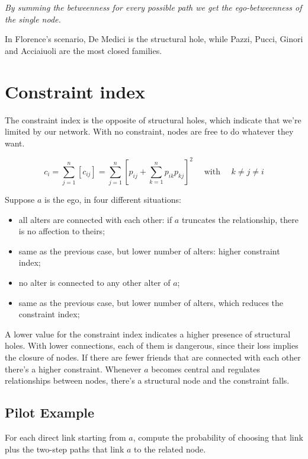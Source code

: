 \documentclass[
  notitlepage,
  onecolumn,
  openany]{book}
\providecommand{\tightlist}{%
  \setlength{\itemsep}{0pt}\setlength{\parskip}{0pt}}
\begin{document}
\emph{By summing the betweenness for every possible path we get the ego-betweenness of the single node.}

In Florence's scenario, De Medici is the structural hole, while Pazzi, Pucci, Ginori and Acciaiuoli are the most closed families.

\hypertarget{constraint-index}{%
\section{Constraint index}\label{constraint-index}}

The constraint index is the opposite of structural holes, which indicate that we're limited by our network. With no constraint, nodes are free to do whatever they want.

\[
c_{i}=\sum_{j=1}^{n}\left[c_{i j}\right]=\sum_{j=1}^{n}\left[p_{i j}+\sum_{k=1}^{n} p_{i k} p_{k j}\right]^{2} \quad \text { with } \quad k \neq j \neq i
\]

Suppose \(a\) is the ego, in four different situations:

\begin{itemize}
\tightlist
\item
  all alters are connected with each other: if \(a\) truncates the relationship, there is no affection to theirs;
\item
  same as the previous case, but lower number of alters: higher constraint index;
\item
  no alter is connected to any other alter of \(a\);
\item
  same as the previous case, but lower number of alters, which reduces the constraint index;
\end{itemize}

A lower value for the constraint index indicates a higher presence of structural holes. With lower connections, each of them is dangerous, since their loss implies the closure of nodes. If there are fewer friends that are connected with each other there's a higher constraint. Whenever \(a\) becomes central and regulates relationships between nodes, there's a structural node and the constraint falls.

\hypertarget{pilot-example}{%
\subsection{Pilot Example}\label{pilot-example}}

For each direct link starting from \(a\), compute the probability of choosing that link plus the two-step paths that link \(a\) to the related node.
\end{document}
